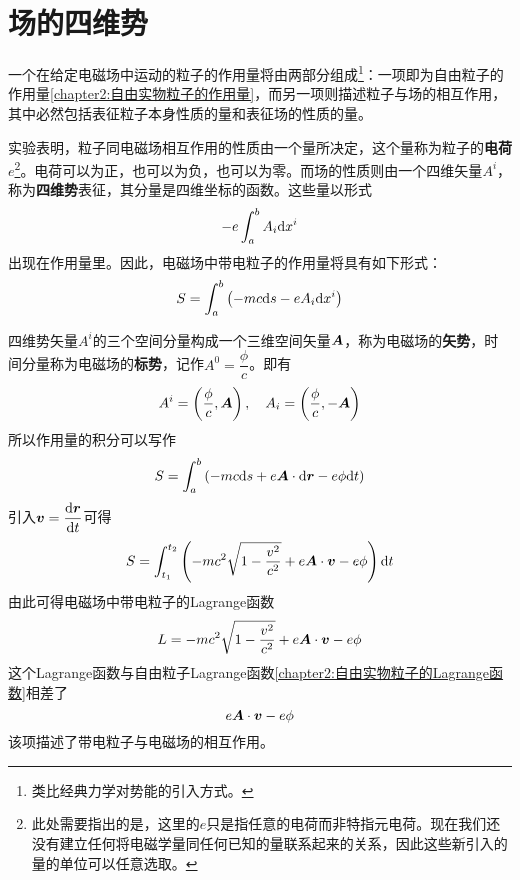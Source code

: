 \section{场的四维势}

一个在给定电磁场中运动的粒子的作用量将由两部分组成\footnote{类比经典力学对势能的引入方式。}：一项即为自由粒子的作用量\eqref{chapter2:自由实物粒子的作用量}，而另一项则描述粒子与场的相互作用，其中必然包括表征粒子本身性质的量和表征场的性质的量。

实验表明，粒子同电磁场相互作用的性质由一个量所决定，这个量称为粒子的{\bf 电荷}$e$\footnote{此处需要指出的是，这里的$e$只是指任意的电荷而非特指元电荷。现在我们还没有建立任何将电磁学量同任何已知的量联系起来的关系，因此这些新引入的量的单位可以任意选取。}。电荷可以为正，也可以为负，也可以为零。而场的性质则由一个四维矢量$A^i$，称为{\bf 四维势}表征，其分量是四维坐标的函数。这些量以形式
\begin{equation*}
	-e\int_a^b A_i\mathrm{d} x^i
\end{equation*}
出现在作用量里。因此，电磁场中带电粒子的作用量将具有如下形式：
\begin{equation}
	S = \int_a^b \left(-mc\mathrm{d} s - eA_i\mathrm{d} x^i\right)
	\label{chapter3:电磁场中带电粒子的作用量1}
\end{equation}

四维势矢量$A^i$的三个空间分量构成一个三维空间矢量$\boldsymbol{A}$，称为电磁场的{\bf 矢势}，时间分量称为电磁场的{\bf 标势}，记作$A^0 = \dfrac{\phi}{c}$。即有
\begin{equation}
	A^i = \left(\frac{\phi}{c},\boldsymbol{A}\right),\quad A_i = \left(\frac{\phi}{c},-\boldsymbol{A}\right)
	\label{chapter3:电磁场的标势和矢势}
\end{equation}
所以作用量的积分可以写作
\begin{equation*}
	S = \int_a^b \left(-mc\mathrm{d} s + e\boldsymbol{A}\cdot \mathrm{d} \boldsymbol{r} - e\phi \mathrm{d} t\right)
\end{equation*}
引入$\boldsymbol{v} = \dfrac{\mathrm{d} \boldsymbol{r}}{\mathrm{d} t}$可得
\begin{equation}
	S = \int_{t_1}^{t_2} \left(-mc^2\sqrt{1-\frac{v^2}{c^2}} + e\boldsymbol{A}\cdot \boldsymbol{v} - e\phi\right) \mathrm{d} t
	\label{chapter3:电磁场中带电粒子的作用量2}
\end{equation}
由此可得电磁场中带电粒子的Lagrange函数
\begin{equation}
	L = -mc^2\sqrt{1-\frac{v^2}{c^2}} + e\boldsymbol{A}\cdot \boldsymbol{v} - e\phi
	\label{chapter3:电磁场中带电粒子的Lagrange函数}
\end{equation}
这个Lagrange函数与自由粒子Lagrange函数\eqref{chapter2:自由实物粒子的Lagrange函数}相差了
\begin{equation*}
	e\boldsymbol{A}\cdot \boldsymbol{v} - e\phi
\end{equation*}
该项描述了带电粒子与电磁场的相互作用。

